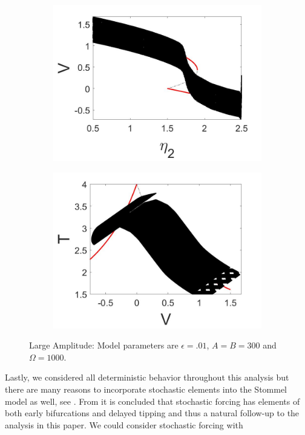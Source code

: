 \begin{figure}[H]
\centering
\begin{subfigure}{.5\textwidth}
 \centering
 \includegraphics[width=\linewidth]{conclusion/large_amp_V.jpg}
 \caption{}
\end{subfigure}%
\begin{subfigure}{.5\textwidth}
 \centering
 \includegraphics[width=\linewidth]{conclusion/large_amp_T.jpg}
 \caption{}
\end{subfigure}
\caption{Large Amplitude: Model parameters are $\epsilon=.01$, $A=B=300$ and $\Omega=1000$.}
\label{fig:large_amp}
\end{figure}

Lastly, we considered all deterministic behavior throughout this analysis but there are many reasons to incorporate stochastic elements into the Stommel model as well, see \cite{lorenzo2012role}. From \cite{zhu2015tipping} it is concluded that stochastic forcing has elements of both early bifurcations and delayed tipping and thus a natural follow-up to the analysis in this paper. We could consider stochastic forcing with

